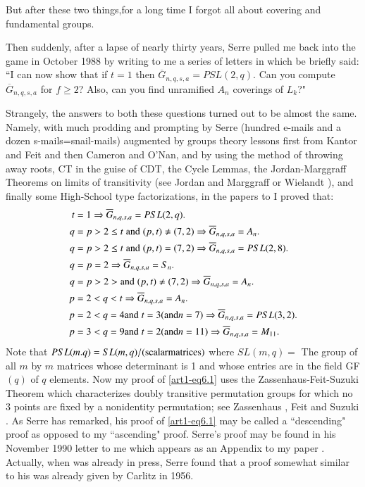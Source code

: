 But after these two things,for a long time I forgot all about covering and fundamental groups.

Then suddenly, after a lapse of nearly thirty years, Serre pulled me back into the game in October 1988 by writing to me a series of letters in which be briefly said: ``I can now show that if $t=1$ then $\overline{G}_{n,q,s,a}=PSL(2,q)$.
Can you compute $\overline{G}_{n,q,s,a}$ for $f\geq 2$? Also, can you find unramified $A_{n}$ coverings of $L_{k}$?"

Strangely, the answers to both these questions turned out to be almost the same. Namely, with much prodding and prompting by Serre (hundred e-mails and a dozen s-mails=snail-mails) augmented by groups theory lessons first from Kantor and Feit and then Cameron and O'Nan, and by using the method of throwing away roots, CT in the guise of CDT, the Cycle Lemmas, the Jordan-Marggraff Theorems on limits of transitivity (see Jordan \cite{art1-key39} and Marggraff \cite{art1-key45} or Wielandt \cite{art1-key60}), and finally some High-School type factorizations, in the papers \cite{art1-key8} to \cite{art1-key10} I proved that: 
\begin{align}
t&=1 \Rightarrow \overline{G}_{n,q,s,a} = PSL(2,q).\label{art1-eq6.1}\\
q&=p > 2 \leq t\; {\rm and} \;(p,t)\neq (7,2) \Rightarrow \overline{G}_{n,q,s,a} = A_{n}.\label{art1-eq6.2}\\
q&=p > 2 \leq t \;{\rm and} \;(p,t) = (7,2) \Rightarrow \overline{G}_{n,q,s,a} = PSL(2,8).\label{art1-eq6.3}\\
q&=p = 2 \Rightarrow \overline{G}_{n,q,s,a} = S_{n}.\label{art1-eq6.4}\\
q&=p > 2 > {\rm and}\; (p,t) \neq (7,2) \Rightarrow \overline{G}_{n,q,s,a} = A_{n}.\label{art1-eq6.5}\\
p&=2 < q < t \Rightarrow \overline{G}_{n,q,s,a} = A_{n}.\label{art1-eq6.6}\\
p&=2 < q = 4 {\rm and} \; t=3 ({\rm and} n=7) \Rightarrow \overline{G}_{n,q,s,a} = PSL(3,2).\label{art1-eq6.7}\\
p&=3 < q = 9 {\rm and} \; t=2 ({\rm and} n=11) \Rightarrow \overline{G}_{n,q,s,a} =M_{11}.\label{art1-eq6.8}
\end{align}
Note that $PSL(m.q)=SL(m,q)/{\rm(scalar matrices)}$ where $SL(m,q)=$ The group of all $m$ by $m$ matrices whose determinant is 1 and whose entries are in the field GF$(q)$ of $q$ elements. Now my proof of \eqref{art1-eq6.1} uses the Zassenhaus-Feit-Suzuki Theorem which characterizes doubly transitive permutation groups for which no 3 points are fixed by a nonidentity permutation; see Zassenhaus \cite{art1-key62}, Feit \cite{art1-key30} and Suzuki \cite{art1-key59}. As Serre has remarked, his proof of \eqref{art1-eq6.1} may be called a ``descending" proof as opposed to my ``ascending" proof. Serre's proof may be found in his November 1990 letter to me which appears as an Appendix to my paper \cite{art1-key8}. Actually, when \cite{art1-key8} was already in press, Serre found that a proof somewhat similar to his was already given by Carlitz \cite{art1-key25} in 1956.  

